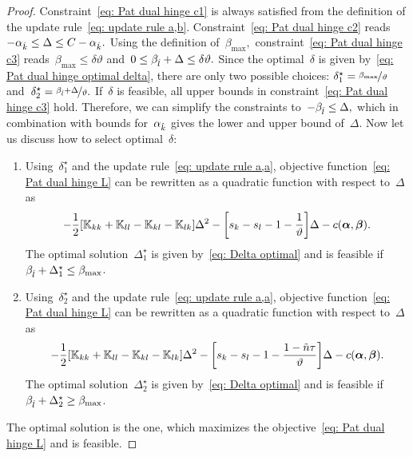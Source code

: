 \begin{proof}
  Constraint~\eqref{eq: Pat dual hinge c1} is always satisfied from the definition of the update rule~\eqref{eq: update rule a,b}. Constraint~\eqref{eq: Pat dual hinge c2} reads~$- \alpha_{\hat{k}} \leq \Delta \leq C - \alpha_{\hat{k}}.$ Using the definition of~$\beta_{\max},$ constraint~\eqref{eq: Pat dual hinge c3} reads~$\beta_{\max} \leq \delta \vartheta$ and~$0 \leq \beta_{\hat{l}} + \Delta \leq \delta \vartheta.$ Since the optimal~$\delta$ is given by~\eqref{eq: Pat dual hinge optimal delta}, there are only two possible choices: $\delta^{\star}_1 = \nicefrac{\beta_{\max}}{\vartheta}$ and~$\delta^{\star}_2 = \nicefrac{\beta_{\hat{l}} + \Delta}{\vartheta}.$ If~$\delta$ is feasible, all upper bounds in constraint~\eqref{eq: Pat dual hinge c3} hold. Therefore, we can simplify the constraints to~$- \beta_{\hat{l}} \leq \Delta,$ which in combination with bounds for~$\alpha_{\hat{k}}$ gives the lower and upper bound of~$\Delta.$ Now let us discuss how to select optimal~$\delta:$
  \begin{enumerate}
    \item Using~$\delta^{\star}_1$ and the update rule~\eqref{eq: update rule a,a}, objective function~\eqref{eq: Pat dual hinge L} can be rewritten as a quadratic function with respect to~$\Delta$ as
    \begin{equation*}
      - \frac{1}{2} \Brac[s]{\K_{kk} + \K_{ll} - \K_{kl} - \K_{lk}} \Delta^2
      - \Brac[s]{s_k - s_l - 1 - \frac{1}{\vartheta}} \Delta
      - c(\bm{\alpha}, \bm{\beta}).
    \end{equation*}
    The optimal solution~$\Delta^{\star}_1$ is given by~\eqref{eq: Delta optimal} and is feasible if~$\beta_{\hat{l}} + \Delta^{\star}_1 \leq \beta_{\max}$.

    \item Using~$\delta^{\star}_2$ and the update rule~\eqref{eq: update rule a,a}, objective function~\eqref{eq: Pat dual hinge L} can be rewritten as a quadratic function with respect to~$\Delta$ as
    \begin{equation*}
      - \frac{1}{2} \Brac[s]{\K_{kk} + \K_{ll} - \K_{kl} - \K_{lk}} \Delta^2
      - \Brac[s]{s_k - s_l - 1 - \frac{1 - \ntil \tau}{\vartheta}} \Delta
      - c(\bm{\alpha}, \bm{\beta}).
    \end{equation*}
    The optimal solution~$\Delta^{\star}_2$ is given by~\eqref{eq: Delta optimal} and is feasible if~$\beta_{\hat{l}} + \Delta^{\star}_2 \geq \beta_{\max}$.
  \end{enumerate}
  The optimal solution is the one, which maximizes the objective~\eqref{eq: Pat dual hinge L} and is feasible.
\end{proof}


